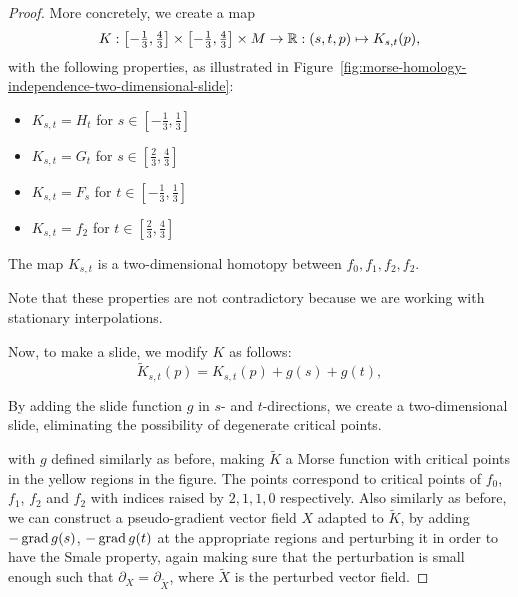 \begin{proof}
More concretely, we create a map
\[
    K: \left[-\tfrac{1}{3}, \tfrac{4}{3}\right] \times \left[-\tfrac{1}{3}, \tfrac{4}{3}\right] \times M \to  \mathbb{R}:  (s, t, p) \mapsto K_{s, t}(p)
,\] 
with the following properties, as illustrated in Figure~\ref{fig:morse-homology-independence-two-dimensional-slide}:
\begin{itemize}
    \item $K_{s,t} = H_t$ for  $s \in \left[-\tfrac{1}{3}, \tfrac{1}{3}\right]$
    \item $K_{s,t} = G_t$ for  $s \in \left[\tfrac{2}{3}, \tfrac{4}{3}\right]$
        \item $K_{s, t} = F_s$ for $t \in \left[-\tfrac{1}{3}, \tfrac{1}{3}\right]$ 
        \item $K_{s,t} = f_2$ for $t \in \left[\tfrac{2}{3}, \tfrac{4}{3}\right]$
\end{itemize}
\begin{marginfigure}
    \centering
    \caption{The map $K_{s,t}$ is a two-dimensional homotopy between $f_0, f_1, f_2, f_2$.}
    \label{fig:morse-homology-independence-two-dimensional-slide}
\end{marginfigure}
Note that these properties are not contradictory because we are working with stationary interpolations.

Now, to make a slide, we modify $K$ as follows:
 \[
     \tilde{K}_{s,t}(p) = K_{s,t}(p) + g(s) + g(t)
,\] 

\begin{marginfigure}
    \centering
    \caption{By adding the slide function $g$ in $s$- and $t$-directions, we create a two-dimensional slide, eliminating the possibility of degenerate critical points.}
    \label{fig:morse-homology-independence-two-dimensional-slide-three-d}
\end{marginfigure}

with $g$ defined similarly as before, making $\tilde{K}$ a Morse function with critical points in the yellow regions in the figure.
The points correspond to critical points of $f_0$, $f_1$, $f_2$ and $f_2$ with indices raised by $2, 1, 1, 0$ respectively.
Also similarly as before, we can construct a pseudo-gradient vector field $X$ adapted to $\tilde{K}$, by adding $-\operatorname{grad} g(s)$, $-\operatorname{grad} g(t)$ at the appropriate regions and perturbing it in order to have the Smale property, again making sure that the perturbation is small enough such that $\partial_X = \partial_{\tilde X}$, where $\tilde{X}$ is the perturbed vector field.


\end{proof}
